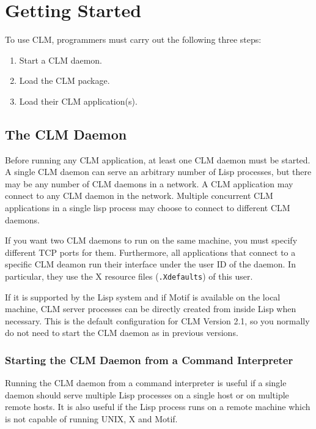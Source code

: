 \nocite{xlib}
\nocite{xtoolkit}
\nocite{motif-prog-ref}
\nocite{clue}
\nocite{common-lisp}
\nocite{berlage-motif}

\chapter{Getting Started}

To use CLM, programmers must carry out the following three steps:
\begin{enumerate}
\item Start a CLM daemon.
\item Load the CLM package.
\item Load their CLM application(s).
\end{enumerate}

\section{The CLM Daemon}

Before running any CLM application, at least one CLM daemon must be started. 
A single CLM daemon can serve an arbitrary number of Lisp processes, but there
may be any number of CLM daemons in a network.  A CLM application may connect
to any CLM daemon in the network.  Multiple concurrent CLM applications in a
single lisp process may choose to connect to different CLM daemons.  

If you want two CLM daemons to run on the same machine, you must specify
different TCP ports for them. Furthermore, all applications that connect to a
specific CLM deamon run their interface under the user ID of the daemon.
In particular, they use the X resource files ({\tt .Xdefaults}) of this
user.

If it is supported by the Lisp system and if Motif is available on the
local machine, CLM server processes can be directly created from inside
Lisp when necessary. This is the default configuration for CLM Version 2.1,
so you normally do not need to start the CLM daemon as in previous versions.

\subsection{Starting the CLM Daemon from a Command Interpreter}

Running the CLM daemon from a command interpreter is useful if a single
daemon should serve multiple Lisp processes on a single host or on multiple
remote hosts. It is also useful if the Lisp process runs on a remote machine
which is not capable of running UNIX, X and Motif.

